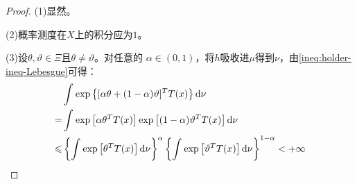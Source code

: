 \begin{proof}
	(1)显然。\par
	(2)概率测度在$X$上的积分应为$1$。\par
	(3)设$\theta,\vartheta\in\Xi$且$\theta\ne\vartheta$。对任意的 $\alpha\in(0,1)$，将$h$吸收进$\mu$得到$\nu$，由\cref{ineq:holder-ineq-Lebesgue}可得：
	\begin{align*}
		&\int_{}^{}\exp\left\{[\alpha\theta+(1-\alpha)\vartheta]^TT(x)\right\}\mathop{}\!\mathrm{d}\nu \\
		=&\int_{}^{}\exp\left[\alpha\theta^TT(x)\right]\exp\left[(1-\alpha)\vartheta^TT(x)\right]\mathop{}\!\mathrm{d}\nu \\
		\leqslant&\left\{\int_{}^{}\exp\left[\theta^TT(x)\right]\mathop{}\!\mathrm{d}\nu\right\}^{\alpha}\left\{\int_{}^{}\exp\left[\vartheta^TT(x)\right]\mathop{}\!\mathrm{d}\nu\right\}^{1-\alpha}<+\infty
	\end{align*}\par
\end{proof}



